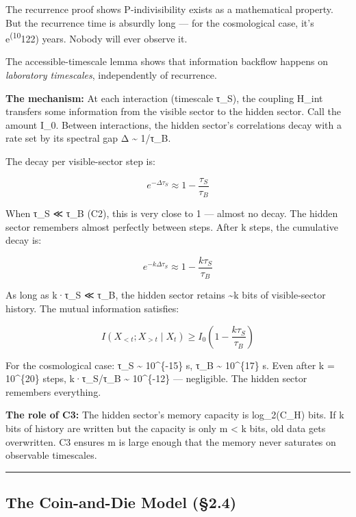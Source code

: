 \documentclass[
]{article}
\begin{document}
The recurrence proof shows P-indivisibility exists as a mathematical
property. But the recurrence time is absurdly long --- for the
cosmological case, it's e\textsuperscript{(10}122) years. Nobody will
ever observe it.

The accessible-timescale lemma shows that information backflow happens
on \emph{laboratory timescales}, independently of recurrence.

\textbf{The mechanism:} At each interaction (timescale τ\_S), the
coupling H\_int transfers some information from the visible sector to
the hidden sector. Call the amount I\_0. Between interactions, the
hidden sector's correlations decay with a rate set by its spectral gap Δ
\textasciitilde{} 1/τ\_B.

The decay per visible-sector step is:

\[e^{-\Delta \tau_S} \approx 1 - \frac{\tau_S}{\tau_B}\]

When τ\_S ≪ τ\_B (C2), this is very close to 1 --- almost no decay. The
hidden sector remembers almost perfectly between steps. After k steps,
the cumulative decay is:

\[e^{-k\Delta\tau_S} \approx 1 - \frac{k\tau_S}{\tau_B}\]

As long as k·τ\_S ≪ τ\_B, the hidden sector retains \textasciitilde k
bits of visible-sector history. The mutual information satisfies:

\[I(X_{<t}; X_{>t} \mid X_t) \geq I_0\left(1 - \frac{k\tau_S}{\tau_B}\right)\]

For the cosmological case: τ\_S \textasciitilde{} 10\^{}\{-15\} s, τ\_B
\textasciitilde{} 10\^{}\{17\} s. Even after k = 10\^{}\{20\} steps,
k·τ\_S/τ\_B \textasciitilde{} 10\^{}\{-12\} --- negligible. The hidden
sector remembers everything.

\textbf{The role of C3:} The hidden sector's memory capacity is
log\_2(\textbar C\_H\textbar) bits. If k bits of history are written but
the capacity is only m \textless{} k bits, old data gets overwritten. C3
ensures m is large enough that the memory never saturates on observable
timescales.

\begin{center}\rule{0.5\linewidth}{0.5pt}\end{center}

\hypertarget{the-coin-and-die-model-2.4}{%
\subsection{The Coin-and-Die Model
(§2.4)}\label{the-coin-and-die-model-2.4}}
\end{document}
